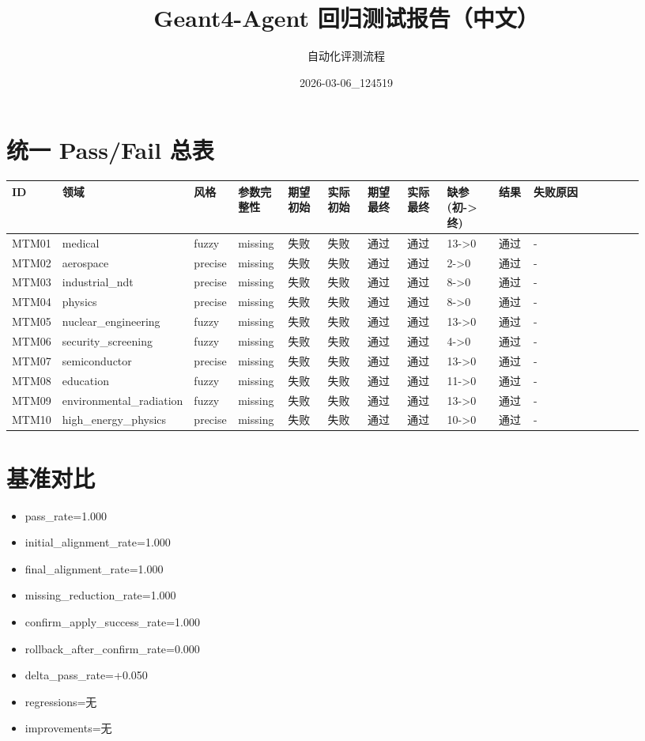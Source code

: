 \documentclass[11pt]{ctexart}
\title{Geant4-Agent 回归测试报告（中文）}
\author{自动化评测流程}
\date{2026-03-06\_124519}
\begin{document}
\maketitle
\section{统一 Pass/Fail 总表}
\begin{longtable}{p{0.06\linewidth}p{0.08\linewidth}p{0.07\linewidth}p{0.08\linewidth}p{0.07\linewidth}p{0.07\linewidth}p{0.07\linewidth}p{0.07\linewidth}p{0.09\linewidth}p{0.06\linewidth}p{0.21\linewidth}}
\toprule
ID & 领域 & 风格 & 参数完整性 & 期望初始 & 实际初始 & 期望最终 & 实际最终 & 缺参(初->终) & 结果 & 失败原因 \\
\midrule
MTM01 & medical & fuzzy & missing & 失败 & 失败 & 通过 & 通过 & 13->0 & 通过 & - \\
MTM02 & aerospace & precise & missing & 失败 & 失败 & 通过 & 通过 & 2->0 & 通过 & - \\
MTM03 & industrial\_ndt & precise & missing & 失败 & 失败 & 通过 & 通过 & 8->0 & 通过 & - \\
MTM04 & physics & precise & missing & 失败 & 失败 & 通过 & 通过 & 8->0 & 通过 & - \\
MTM05 & nuclear\_engineering & fuzzy & missing & 失败 & 失败 & 通过 & 通过 & 13->0 & 通过 & - \\
MTM06 & security\_screening & fuzzy & missing & 失败 & 失败 & 通过 & 通过 & 4->0 & 通过 & - \\
MTM07 & semiconductor & precise & missing & 失败 & 失败 & 通过 & 通过 & 13->0 & 通过 & - \\
MTM08 & education & fuzzy & missing & 失败 & 失败 & 通过 & 通过 & 11->0 & 通过 & - \\
MTM09 & environmental\_radiation & fuzzy & missing & 失败 & 失败 & 通过 & 通过 & 13->0 & 通过 & - \\
MTM10 & high\_energy\_physics & precise & missing & 失败 & 失败 & 通过 & 通过 & 10->0 & 通过 & - \\
\bottomrule
\end{longtable}
\section{基准对比}
\begin{itemize}
\item pass\_rate=1.000
\item initial\_alignment\_rate=1.000
\item final\_alignment\_rate=1.000
\item missing\_reduction\_rate=1.000
\item confirm\_apply\_success\_rate=1.000
\item rollback\_after\_confirm\_rate=0.000
\item delta\_pass\_rate=+0.050
\item regressions=无
\item improvements=无
\end{itemize}
\appendix
\end{document}

